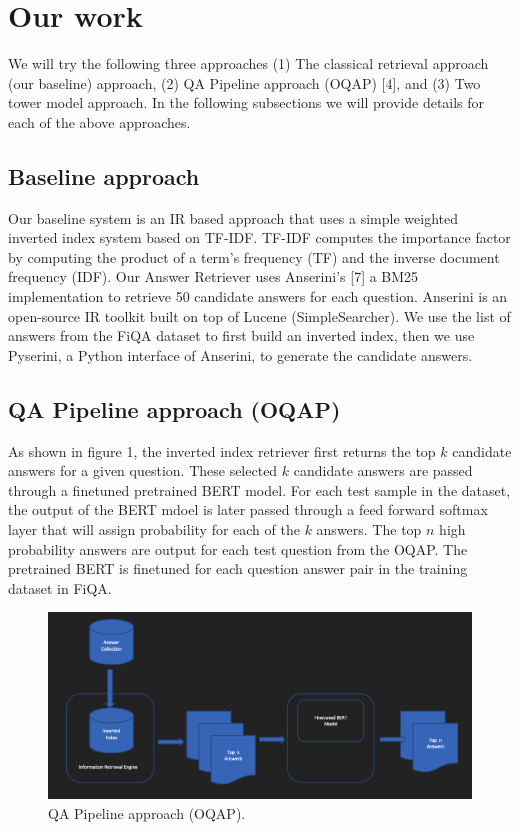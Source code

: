 \documentclass[11pt,a4paper]{article}
\begin{document}
\section{Our work}
We will try the following three approaches (1) The classical retrieval approach (our baseline) approach, (2) QA Pipeline approach (OQAP) [4], and (3) Two tower model approach. In the following subsections we will provide details for each of the above approaches.


\subsection{Baseline approach}
\label{sect:pdf}
Our baseline system is an IR based approach that uses a simple weighted inverted index system based on TF-IDF. TF-IDF computes the importance factor by computing the product of a term’s frequency (TF) and the inverse document frequency (IDF). Our Answer Retriever uses Anserini’s [7] a BM25 implementation to retrieve 50 candidate answers for each question. Anserini is an open-source IR toolkit built on top of Lucene (SimpleSearcher). We use the list of answers from the FiQA dataset to first build an inverted index, then we use Pyserini, a Python interface of Anserini, to generate the candidate answers.

\subsection{QA Pipeline approach (OQAP)}
As shown in figure 1, the inverted index retriever first returns the top $k$ candidate answers for a given question. These selected $k$ candidate answers are passed through a finetuned pretrained BERT model. For each test sample in the dataset, the output of the BERT mdoel is later passed through a feed forward softmax layer that will assign probability for each of the $k$ answers. The top $n$  high probability answers are output for each test question from the OQAP. The pretrained BERT is finetuned for each question answer pair in the training dataset in FiQA.

\begin{figure}
  \includegraphics[width=\linewidth]{baseline.png}
  \caption{QA Pipeline approach (OQAP).}
  \label{fig:QA Pipeline approach (OQAP)}
\end{figure}
\end{document}
